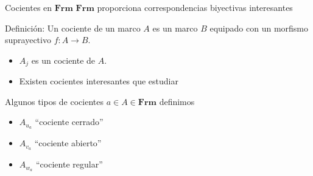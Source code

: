 \documentclass[compress,12pt]{beamer}
\begin{document}
\begin{frame}{Cocientes en $\mathbf{Frm}$}
$\mathbf{Frm}$ proporciona correspondencias biyectivas interesantes

\end{frame}

\begin{frame}
\begin{block}{Definición:}
    Un cociente de un marco $A$ es un marco $B$ equipado con un morfismo suprayectivo $f\colon A\to B$.
\end{block}
\begin{itemize}
\item<3-> $A_j$ es un cociente de $A$.
\item<4-> Existen cocientes interesantes que estudiar
\end{itemize}
\end{frame}

\begin{frame}{Algunos tipos de cocientes}
    $a\in A\in \mathbf{Frm}$ definimos
    
    \begin{itemize}
    \item<3-> $A_{u_a}$ ``cociente cerrado'' 
    \item<4-> $A_{v_a}$ ``cociente abierto'' 
    \item<5-> $A_{w_a}$ ``cociente regular'' 
    \end{itemize}
    \end{frame}
\end{document}
